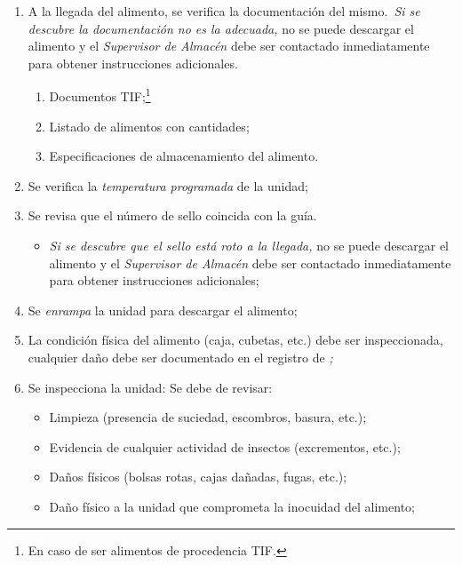 \begin{enumerate}
    \item A la llegada del alimento, se verifica la documentación del mismo.\ \emph{Si se descubre la documentación no es la adecuada,} no se puede descargar el alimento y el \emph{Supervisor de Almacén} debe ser contactado inmediatamente para obtener instrucciones adicionales.
          \begin{enumerate}
              \item Documentos TIF;\footnote{En caso de ser alimentos de procedencia TIF.}
              \item Listado de alimentos con cantidades;
              \item Especificaciones de almacenamiento del alimento.
          \end{enumerate}
    \item Se verifica la \emph{temperatura programada} de la unidad;
    \item Se revisa que el número de sello coincida con la guía.\
        \begin{itemize}
            \item \emph{Si se descubre que el sello está roto a la llegada,} no se puede descargar el alimento y el \emph{Supervisor de Almacén} debe ser contactado inmediatamente para obtener instrucciones adicionales;
        \end{itemize}
    \item Se \textit{enrampa} la unidad para descargar el alimento;
    \item La condición física del alimento (caja, cubetas, etc.) debe ser inspeccionada, cualquier daño debe ser documentado en el registro de \textit{\Oent;}
    \item Se inspecciona la unidad: Se debe de revisar:
            \begin{itemize}
              \item Limpieza (presencia de suciedad, escombros, basura, etc.);
              \item Evidencia de cualquier actividad de insectos (excrementos, etc.);
              \item Daños físicos (bolsas rotas, cajas dañadas, fugas, etc.);
              \item Daño físico a la unidad que comprometa la inocuidad del alimento;

\end{itemize}
\end{enumerate}
